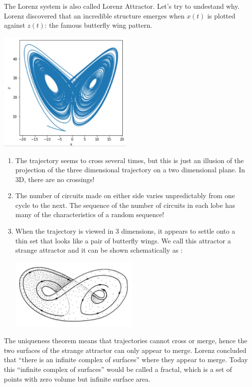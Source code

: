 \documentclass[12pt]{article}
\begin{document}
	The Lorenz system is also called Lorenz Attractor. Let's try to undestand why. Lorenz discovered that an incredible structure emerges when $x(t)$ is plotted against $z(t)$: the famous butterfly wing pattern.
	\begin{center}
		\includegraphics[width=0.5\textwidth]{"images/butterfly.jpg"}
	\end{center}
	\begin{enumerate}[label=\textbullet]
		\item The trajectory seems to cross several times, but this is just an illusion of the projection of the three dimensional trajectory on a two dimensional plane. In 3D, there are no crossings!
		\item The number of circuits made on either side varies unpredictably from one cycle to the next. The sequence of the number of circuits in each lobe has many of the characteristics of a random sequence!
		\item When the trajectory is viewed in 3 dimensions, it appears to settle onto a thin set that looks like a pair of butterfly wings. We call this attractor a strange attractor and it can be shown schematically as :
		\begin{center}
			\includegraphics[width=0.5\textwidth]{"images/butterfly3D.jpg"}
		\end{center}
	\end{enumerate}
	
	\noindent The uniqueness theorem\cite{lecture6} means that trajectories cannot cross or merge, hence the two surfaces of the strange attractor can only appear to merge. Lorenz concluded that “there is an infinite
	complex of surfaces” where they appear to merge. Today this “infinite complex of surfaces” would be called a fractal, which is a set of points with zero volume but infinite surface area.
	
\end{document}
